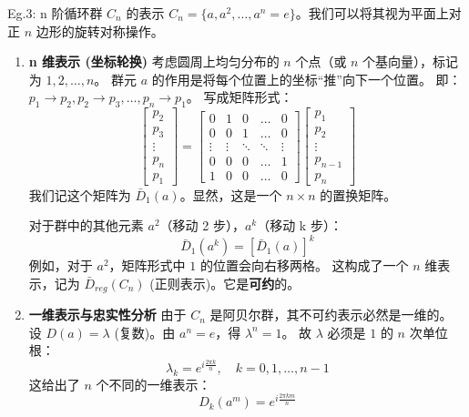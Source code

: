\begin{example}{Eg.3: n 阶循环群 $C_n$ 的表示}
    $C_n = \{a, a^2, \dots, a^n=e\}$。我们可以将其视为平面上对正 $n$ 边形的旋转对称操作。
    
    \begin{enumerate}
        \item \textbf{n 维表示 (坐标轮换)}
    考虑圆周上均匀分布的 $n$ 个点（或 $n$ 个基向量），标记为 $1, 2, \dots, n$。
    群元 $a$ 的作用是将每个位置上的坐标“推”向下一个位置。
    即：$p_1 \to p_2, p_2 \to p_3, \dots, p_n \to p_1$。
    写成矩阵形式：
    \begin{equation}
        \begin{bmatrix} p_2 \\ p_3 \\ \vdots \\ p_n \\ p_1 \end{bmatrix} = 
        \begin{bmatrix} 
            0 & 1 & 0 & \dots & 0 \\
            0 & 0 & 1 & \dots & 0 \\
            \vdots & \vdots & \ddots & \ddots & \vdots \\
            0 & 0 & 0 & \dots & 1 \\
            1 & 0 & 0 & \dots & 0
        \end{bmatrix}
        \begin{bmatrix} p_1 \\ p_2 \\ \vdots \\ p_{n-1} \\ p_n \end{bmatrix}
    \end{equation}
    我们记这个矩阵为 $\bar{D}_1(a)$。显然，这是一个 $n \times n$ 的置换矩阵。
    
    对于群中的其他元素 $a^2$（移动 2 步），$a^k$（移动 k 步）：
    \begin{equation}
        \bar{D}_1(a^k) = [\bar{D}_1(a)]^k
    \end{equation}
    例如，对于 $a^2$，矩阵形式中 $1$ 的位置会向右移两格。
    这构成了一个 $n$ 维表示，记为 $\bar{D}_{reg}(C_n)$ (正则表示)。它是\textbf{可约}的。

        \item \textbf{一维表示与忠实性分析}
    由于 $C_n$ 是阿贝尔群，其不可约表示必然是一维的。
    设 $D(a) = \lambda$ (复数)。由 $a^n = e$，得 $\lambda^n = 1$。
    故 $\lambda$ 必须是 $1$ 的 $n$ 次单位根：
    \begin{equation}
        \lambda_k = e^{i \frac{2\pi k}{n}}, \quad k = 0, 1, \dots, n-1
    \end{equation}
    这给出了 $n$ 个不同的一维表示：
    \begin{equation}
        D_k(a^m) = e^{i \frac{2\pi k m}{n}}
    \end{equation}
    

\end{enumerate}
\end{example}
